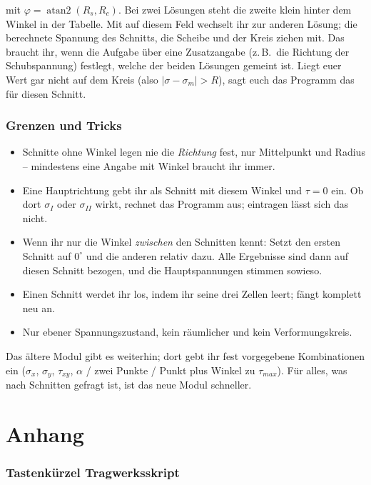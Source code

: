 mit $\varphi = \operatorname{atan2}(R_s, R_c)$. Bei zwei Lösungen steht die zweite klein hinter
dem Winkel in der Tabelle. Mit  auf diesem Feld wechselt ihr zur anderen Lösung; die
berechnete Spannung des Schnitts, die Scheibe und der Kreis ziehen mit. Das braucht ihr, wenn die
Aufgabe über eine Zusatzangabe (z.\,B.\ die Richtung der Schubspannung) festlegt, welche der beiden
Lösungen gemeint ist. Liegt euer Wert gar nicht auf dem Kreis (also
$|\sigma - \sigma_m| > R$), sagt euch das Programm das für diesen Schnitt.

\section{Grenzen und Tricks}

\begin{itemize}
  \item Schnitte ohne Winkel legen nie die \emph{Richtung} fest, nur Mittelpunkt und Radius --
        mindestens eine Angabe mit Winkel braucht ihr immer.
  \item Eine Hauptrichtung gebt ihr als Schnitt mit diesem Winkel und $\tau = 0$ ein. Ob dort
        $\sigma_I$ oder $\sigma_{II}$ wirkt, rechnet das Programm aus; eintragen lässt sich das nicht.
  \item Wenn ihr nur die Winkel \emph{zwischen} den Schnitten kennt: Setzt den ersten Schnitt auf
        $0^\circ$ und die anderen relativ dazu. Alle Ergebnisse sind dann auf diesen Schnitt
        bezogen, und die Hauptspannungen stimmen sowieso.
  \item Einen Schnitt werdet ihr los, indem ihr seine drei Zellen leert;  fängt
        komplett neu an.
  \item Nur ebener Spannungszustand, kein räumlicher und kein Verformungskreis.
\end{itemize}

Das ältere Modul  gibt es weiterhin; dort gebt ihr fest vorgegebene
Kombinationen ein ($\sigma_x$, $\sigma_y$, $\tau_{xy}$, $\alpha$ / zwei Punkte / Punkt plus
Winkel zu $\tau_{max}$). Für alles, was nach Schnitten gefragt ist, ist das neue Modul schneller.


\appendix
\part{Anhang}

\section{Tastenkürzel Tragwerksskript}

